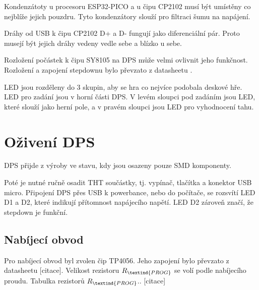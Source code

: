 Kondenzátoty u procesoru ESP32-PICO a u čipu CP2102 musí být umístěny co nejblíže jejich pouzdru. Tyto kondenzátory slouží pro 
filtraci šumu na napájení.

Dráhy od USB k čipu CP2102 D+ a D- fungují jako diferenciální pár. Proto musejí být jejich dráhy vedeny vedle sebe a blízko u 
sebe.

Rozložení počástek k čipu SY8105 na DPS může velmi ovlivnit jeho funkčnost. Rozložení a zapojení stepdownu 
bylo převzato z datasheetu \cite{SY8105_datasheet}. %

LED jsou rozděleny do 3 skupin, aby se hra co nejvíce podobala deskové hře. LED pro zadání jsou v horní části DPS. V levém 
sloupci pod zadáním jsou LED, které slouží jako herní pole, a v pravém sloupci jsou LED pro vyhodnocení tahu.

\chapter{Oživení DPS}
DPS přijde z výroby ve stavu, kdy jsou osazeny pouze SMD komponenty. %

Poté je nutné ručně osadit THT součástky, tj. vypínač, tlačítka a konektor USB micro. Připojení DPS přes USB k powerbance, 
nebo do počítače, se rozsvítí LED D1 a D2, které indikují přítomnost napájecího napětí. LED D2 zároveň značí, že stepdown je 
funkční.















\section{Nabíjecí obvod}
Pro nabíjecí obvod byl zvolen čip TP4056. Jeho zapojení bylo převzato z datasheetu [citace]. %
Velikost rezistoru $R_\textind{PROG}$ se volí podle nabíjecího proudu. 
Tabulka rezistorů $R_\textind{PROG}$.. [citace]

